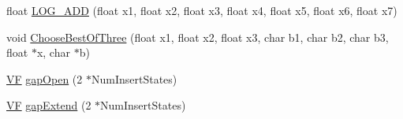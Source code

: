 \begin{DoxyCompactItemize}
\item 
float \hyperlink{namespace_p_r_o_b_c_o_n_s_abc231304d5d131d26c635ee7121f3619}{L\+O\+G\+\_\+\+A\+D\+D} (float x1, float x2, float x3, float x4, float x5, float x6, float x7)
\item 
void \hyperlink{namespace_p_r_o_b_c_o_n_s_a40f96f04d0cecca659a9585ded4975b0}{Choose\+Best\+Of\+Three} (float x1, float x2, float x3, char b1, char b2, char b3, float $\ast$x, char $\ast$b)
\item 
\hyperlink{namespace_p_r_o_b_c_o_n_s_a7d46b91dfef3fa4038545a492ad12221}{V\+F} \hyperlink{namespace_p_r_o_b_c_o_n_s_aad90cbdf21742e0d50a23be886afbffe}{gap\+Open} (2 $\ast$Num\+Insert\+States)
\item 
\hyperlink{namespace_p_r_o_b_c_o_n_s_a7d46b91dfef3fa4038545a492ad12221}{V\+F} \hyperlink{namespace_p_r_o_b_c_o_n_s_ae1d3cf6541679992bb3dc1a89e0347d5}{gap\+Extend} (2 $\ast$Num\+Insert\+States)
\end{DoxyCompactItemize}
